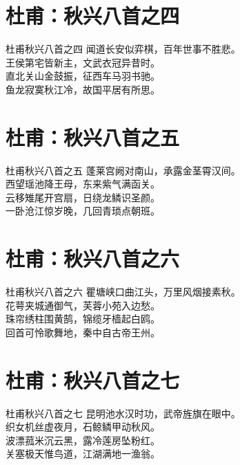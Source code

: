\documentclass[12pt,oneside,a5paper]{book}
\begin{document}
\chapter{杜甫：秋兴八首之四}
\begin{poemzh}{杜甫}{秋兴八首之四}
闻道长安似弈棋，百年世事不胜悲。\\
王侯第宅皆新主，文武衣冠异昔时。\\
直北关山金鼓振，征西车马羽书驰。\\
鱼龙寂寞秋江冷，故国平居有所思。\\
\end{poemzh}

\chapter{杜甫：秋兴八首之五}
\begin{poemzh}{杜甫}{秋兴八首之五}
蓬莱宫阙对南山，承露金茎霄汉间。\\
西望瑶池降王母，东来紫气满函关。\\
云移雉尾开宫扇，日绕龙鳞识圣颜。\\
一卧沧江惊岁晚，几回青琐点朝班。\\
\end{poemzh}

\chapter{杜甫：秋兴八首之六}
\begin{poemzh}{杜甫}{秋兴八首之六}
瞿塘峡口曲江头，万里风烟接素秋。\\
花萼夹城通御气，芙蓉小苑入边愁。\\
珠帘绣柱围黄鹄，锦缆牙樯起白鸥。\\
回首可怜歌舞地，秦中自古帝王州。\\
\end{poemzh}

\chapter{杜甫：秋兴八首之七}
\begin{poemzh}{杜甫}{秋兴八首之七}
昆明池水汉时功，武帝旌旗在眼中。\\
织女机丝虚夜月，石鲸鳞甲动秋风。\\
波漂菰米沉云黑，露冷莲房坠粉红。\\
关塞极天惟鸟道，江湖满地一渔翁。\\
\end{poemzh}
\end{document}
